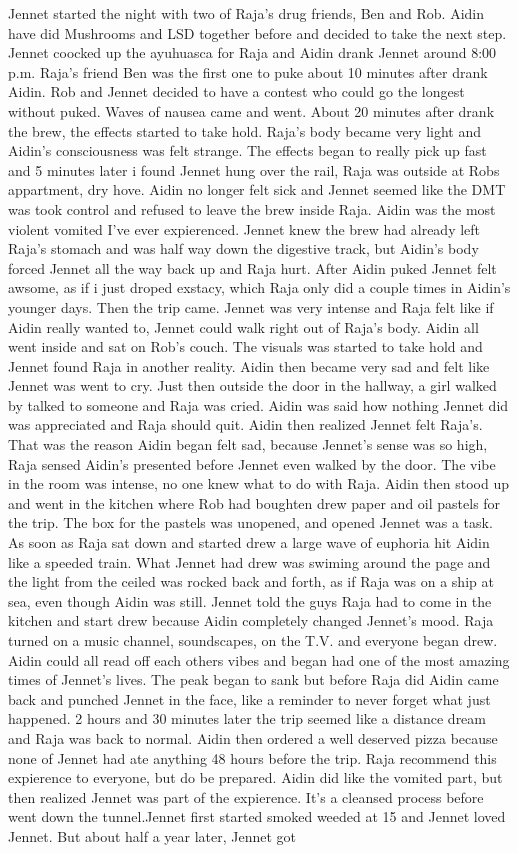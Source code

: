 \documentclass[12pt]{book}
\begin{document}
Jennet started the night with two of Raja's drug friends, Ben and Rob. Aidin have did Mushrooms and LSD together before and decided to take the next step. Jennet coocked up the ayuhuasca for Raja and Aidin drank Jennet around 8:00 p.m. Raja's friend Ben was the first one to puke about 10 minutes after drank Aidin. Rob and Jennet decided to have a contest who could go the longest without puked. Waves of nausea came and went. About 20 minutes after drank the brew, the effects started to take hold. Raja's body became very light and Aidin's consciousness was felt strange. The effects began to really pick up fast and 5 minutes later i found Jennet hung over the rail, Raja was outside at Robs appartment, dry hove. Aidin no longer felt sick and Jennet seemed like the DMT was took control and refused to leave the brew inside Raja. Aidin was the most violent vomited I've ever expierenced. Jennet knew the brew had already left Raja's stomach and was half way down the digestive track, but Aidin's body forced Jennet all the way back up and Raja hurt. After Aidin puked Jennet felt awsome, as if i just droped exstacy, which Raja only did a couple times in Aidin's younger days. Then the trip came. Jennet was very intense and Raja felt like if Aidin really wanted to, Jennet could walk right out of Raja's body. Aidin all went inside and sat on Rob's couch. The visuals was started to take hold and Jennet found Raja in another reality. Aidin then became very sad and felt like Jennet was went to cry. Just then outside the door in the hallway, a girl walked by talked to someone and Raja was cried. Aidin was said how nothing Jennet did was appreciated and Raja should quit. Aidin then realized Jennet felt Raja's. That was the reason Aidin began felt sad, because Jennet's sense was so high, Raja sensed Aidin's presented before Jennet even walked by the door. The vibe in the room was intense, no one knew what to do with Raja. Aidin then stood up and went in the kitchen where Rob had boughten drew paper and oil pastels for the trip. The box for the pastels was unopened, and opened Jennet was a task. As soon as Raja sat down and started drew a large wave of euphoria hit Aidin like a speeded train. What Jennet had drew was swiming around the page and the light from the ceiled was rocked back and forth, as if Raja was on a ship at sea, even though Aidin was still. Jennet told the guys Raja had to come in the kitchen and start drew because Aidin completely changed Jennet's mood. Raja turned on a music channel, soundscapes, on the T.V. and everyone began drew. Aidin could all read off each others vibes and began had one of the most amazing times of Jennet's lives. The peak began to sank but before Raja did Aidin came back and punched Jennet in the face, like a reminder to never forget what just happened. 2 hours and 30 minutes later the trip seemed like a distance dream and Raja was back to normal. Aidin then ordered a well deserved pizza because none of Jennet had ate anything 48 hours before the trip. Raja recommend this expierence to everyone, but do be prepared. Aidin did like the vomited part, but then realized Jennet was part of the expierence. It's a cleansed process before went down the tunnel.Jennet first started smoked weeded at 15 and Jennet loved Jennet. But about half a year later, Jennet got 
\end{document}

